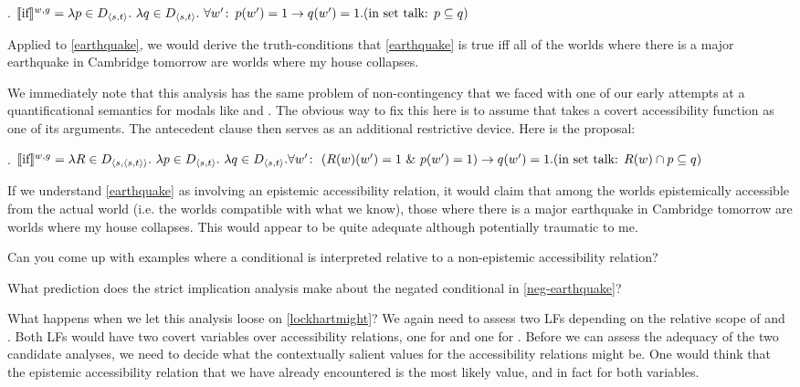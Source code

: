 \ex. $\llbracket \mbox{if} \rrbracket^{w,g} = \lambda p \in D_{\langle s,t \rangle}.\ \lambda q \in D_{\langle s,t \rangle}.\ \forall w'\colon\thinspace p(w')=1 \rightarrow q(w')=1.\\[6pt]
(\mbox{in set talk: } p \subseteq q)$

Applied to \ref{earthquake}, we would derive the truth-conditions that \ref{earthquake} is true iff all of the worlds where there is a major earthquake in Cambridge tomorrow are worlds where my house collapses.

We immediately note that this analysis has the same problem of non-contingency that we faced with one of our early attempts at a quantificational semantics for modals like  and . The obvious way to fix this here is to assume that  takes a covert accessibility function as one of its arguments. The antecedent clause then serves as an additional restrictive device. Here is the proposal:

\ex. $\sv{\mbox{if}}^{w,g} = \lambda R \in D_{\angles{s,\angles{s,t}}}.\ \lambda p\in D_{\angles{s,t}}.\ \lambda q\in D_{\angles{s,t}}.\\
\null\hfill \forall w'\co \left( R(w)(w')=1\ \&\ p(w')=1 \right) \rightarrow q(w')=1.\\[6pt]
(\mbox{in set talk: }R(w)\cap p \subseteq q)$

If we understand \ref{earthquake} as involving an epistemic accessibility relation, it would claim that among the worlds epistemically accessible from the actual world (i.e. the worlds compatible with what we know), those where there is a major earthquake in Cambridge tomorrow are worlds where my house collapses. This would appear to be quite adequate \dash although potentially traumatic to me.

\begin{exercise}
	
	Can you come up with examples where a conditional is interpreted relative to a non-epistemic accessibility relation? \eex
\end{exercise}

\begin{exercise}
	
	What prediction does the strict implication analysis make about the negated conditional in \ref{neg-earthquake}? \eex
\end{exercise}

%
%
What happens when we let this analysis loose on \ref{lockhartmight}? We again need to assess two LFs depending on the relative scope of  and . Both LFs would have two covert variables over accessibility relations, one for  and one for . Before we can assess the adequacy of the two candidate analyses, we need to decide what the contextually salient values for the accessibility relations might be. One would think that the epistemic accessibility relation that we have already encountered is the most likely value, and in fact for both variables.

